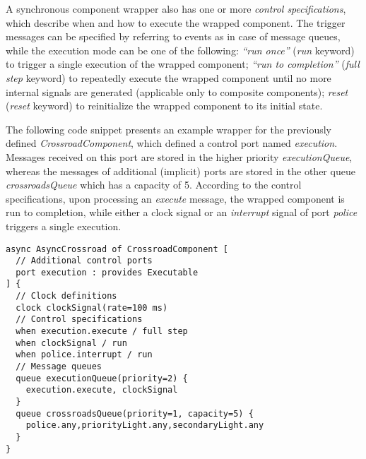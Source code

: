 A synchronous component wrapper also has one or more \emph{control specifications}, which describe when and how to execute the wrapped component. The trigger messages can be specified by referring to events as in case of message queues, while the execution mode can be one of the following: 
\emph{``run once''} (\emph{run} keyword) to trigger a single execution of the wrapped component;
\emph{``run to completion''} (\emph{full step} keyword) to repeatedly execute the wrapped component until no more internal signals are generated (applicable only to composite components);
\emph{reset} (\emph{reset} keyword) to reinitialize the wrapped component to its initial state.


The following code snippet presents an example wrapper for the previously defined \emph{CrossroadComponent}, which defined a control port named \emph{execution}. Messages received on this port are stored in the higher priority \emph{executionQueue}, whereas
the messages of additional (implicit) ports are stored in the other queue \emph{crossroadsQueue} which has a capacity of 5. According to the control specifications, upon processing an \emph{execute} message, the wrapped component is run to completion, while either
a clock signal or an \emph{interrupt} signal of port \emph{police} triggers a single execution.
\begin{lstlisting}
async AsyncCrossroad of CrossroadComponent [
  // Additional control ports
  port execution : provides Executable
] {
  // Clock definitions
  clock clockSignal(rate=100 ms)
  // Control specifications
  when execution.execute / full step
  when clockSignal / run
  when police.interrupt / run
  // Message queues
  queue executionQueue(priority=2) {
    execution.execute, clockSignal
  }
  queue crossroadsQueue(priority=1, capacity=5) {
    police.any,priorityLight.any,secondaryLight.any
  }
}
\end{lstlisting}
